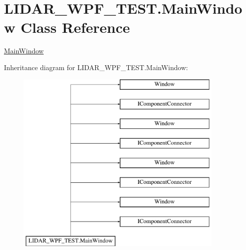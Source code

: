 \hypertarget{class_l_i_d_a_r___w_p_f___t_e_s_t_1_1_main_window}{}\section{L\+I\+D\+A\+R\+\_\+\+W\+P\+F\+\_\+\+T\+E\+S\+T.\+Main\+Window Class Reference}
\label{class_l_i_d_a_r___w_p_f___t_e_s_t_1_1_main_window}


\hyperlink{class_l_i_d_a_r___w_p_f___t_e_s_t_1_1_main_window}{Main\+Window}  


Inheritance diagram for L\+I\+D\+A\+R\+\_\+\+W\+P\+F\+\_\+\+T\+E\+S\+T.\+Main\+Window\+:\begin{figure}[H]
\begin{center}
\leavevmode
\includegraphics[height=9.000000cm]{class_l_i_d_a_r___w_p_f___t_e_s_t_1_1_main_window}
\end{center}
\end{figure}
